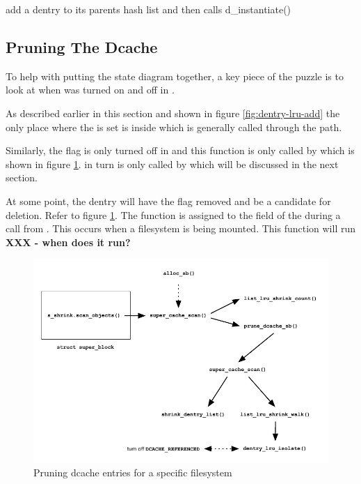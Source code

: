 add  a dentry to its parents hash list and then calls d\_instantiate()


\subsection{Pruning The Dcache}\label{dcache-pruning}

To help with putting the state diagram together, a key piece of the puzzle is to look at when  was turned on and off in . 

As described earlier in this section and shown in figure \ref{fig:dentry-lru-add} the only place where the  is set is inside  which is generally called through the  path.

Similarly, the flag is only turned off in  and this function is only called by  which is shown in figure \ref{fig:dcache-prune}. in turn is only called by  which will be discussed in the next section.

At some point, the dentry will have the   flag removed and be a candidate for deletion. Refer to figure \ref{fig:dcache-prune}. The  function is assigned to the  field of the  during a call from . This occurs when a filesystem is being mounted. This function will run \textbf{XXX - when does it run?}

\begin{figure}[h]
	\includegraphics[scale=0.7]{figures/dcache-prune.pdf}
	\centering
	\caption{Pruning dcache entries for a specific filesystem}
	\label{fig:dcache-prune}
\end{figure}

